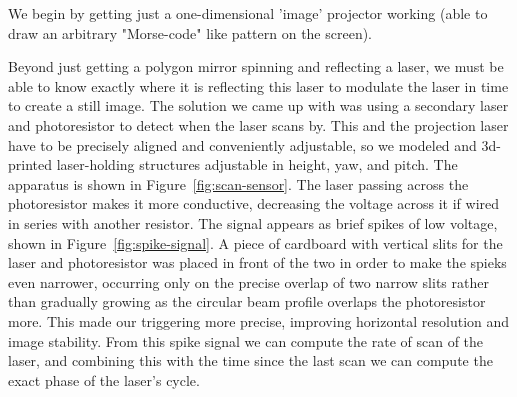 \documentclass[twocolumn]{revtex4-2}
\begin{document}
We begin by getting just a one-dimensional 'image' projector working (able to draw an arbitrary "Morse-code" like pattern on the screen).

Beyond just getting a polygon mirror spinning and reflecting a laser, we must be able to know exactly where it is reflecting this laser to modulate the laser in time to create a still image. The solution we came up with was using a secondary laser and photoresistor to detect when the laser scans by. This and the projection laser have to be precisely aligned and conveniently adjustable, so we modeled and 3d-printed laser-holding structures adjustable in height, yaw, and pitch. The apparatus is shown in Figure~\ref{fig:scan-sensor}. The laser passing across the photoresistor makes it more conductive, decreasing the voltage across it if wired in series with another resistor. The signal appears as brief spikes of low voltage, shown in Figure~\ref{fig:spike-signal}. A piece of cardboard with vertical slits for the laser and photoresistor was placed in front of the two in order to make the spieks even narrower, occurring only on the precise overlap of two narrow slits rather than gradually growing as the circular beam profile overlaps the photoresistor more. This made our triggering more precise, improving horizontal resolution and image stability. From this spike signal we can compute the rate of scan of the laser, and combining this with the time since the last scan we can compute the exact phase of the laser's cycle.
\end{document}
